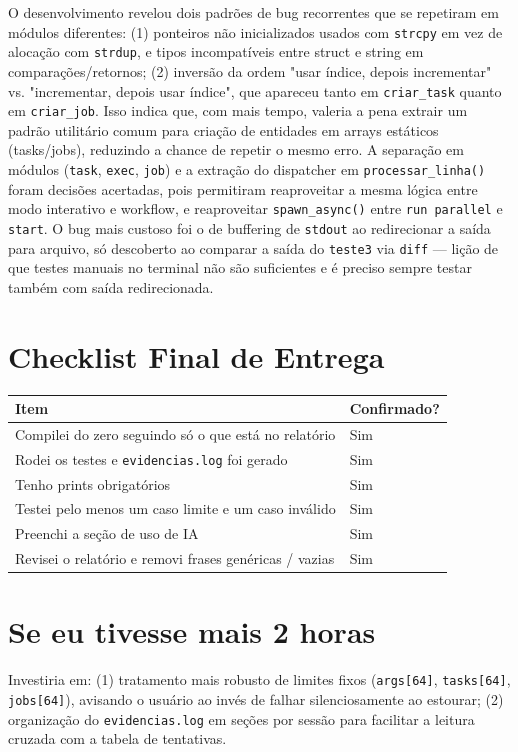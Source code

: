 \documentclass[11pt,a4paper]{article}
\begin{document}
O desenvolvimento revelou dois padrões de bug recorrentes que se repetiram em módulos diferentes: (1)
ponteiros não inicializados usados com \texttt{strcpy} em vez de alocação com \texttt{strdup}, e tipos
incompatíveis entre struct e string em comparações/retornos; (2) inversão da ordem "usar índice, depois
incrementar" vs. "incrementar, depois usar índice", que apareceu tanto em \texttt{criar\_task} quanto em
\texttt{criar\_job}. Isso indica que, com mais tempo, valeria a pena extrair um padrão utilitário comum para
criação de entidades em arrays estáticos (tasks/jobs), reduzindo a chance de repetir o mesmo erro. A
separação em módulos (\texttt{task}, \texttt{exec}, \texttt{job}) e a extração do dispatcher em
\texttt{processar\_linha()} foram decisões acertadas, pois permitiram reaproveitar a mesma lógica entre modo
interativo e workflow, e reaproveitar \texttt{spawn\_async()} entre \texttt{run parallel} e \texttt{start}.
O bug mais custoso foi o de buffering de \texttt{stdout} ao redirecionar a saída para arquivo, só descoberto
ao comparar a saída do \texttt{teste3} via \texttt{diff} --- lição de que testes manuais no terminal não são
suficientes e é preciso sempre testar também com saída redirecionada.

\section{Checklist Final de Entrega}

\begin{longtable}{L{11cm} L{3cm}}
\toprule
\textbf{Item} & \textbf{Confirmado?} \\
\midrule
\endhead
Compilei do zero seguindo só o que está no relatório & Sim \\
Rodei os testes e \texttt{evidencias.log} foi gerado & Sim \\
Tenho prints obrigatórios & Sim \\
Testei pelo menos um caso limite e um caso inválido & Sim \\
Preenchi a seção de uso de IA & Sim \\
Revisei o relatório e removi frases genéricas / vazias & Sim \\
\bottomrule
\end{longtable}

\section{Se eu tivesse mais 2 horas}

Investiria em: (1) tratamento mais robusto de limites fixos (\texttt{args[64]}, \texttt{tasks[64]},
\texttt{jobs[64]}), avisando o usuário ao invés de falhar silenciosamente ao estourar; (2) organização do
\texttt{evidencias.log} em seções por sessão para facilitar a leitura cruzada com a tabela de tentativas.
\end{document}
